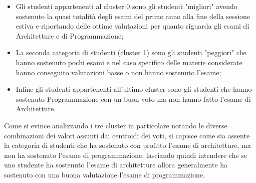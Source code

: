 \documentclass[12pt]{article}
\begin{document}
\begin{itemize}
	\item Gli studenti appartenenti al cluster 0 sono gli studenti "migliori" a\-vendo sostenuto la quasi totalità degli esami del primo anno alla fine della sessione estiva e riportando delle ottime valutazioni per quanto riguarda gli esami di Architetture e di Programmazione;
	\item La seconda categoria di studenti (cluster 1) sono gli studenti "peg\-giori" che hanno sostenuto pochi esami e nel caso specifico delle materie considerate hanno conseguito valutazioni basse o non hanno sostenuto l'esame;
	\item Infine gli studenti appartenenti all'ultimo cluster sono gli studenti che hanno sostenuto Programmazione con un buon voto ma non hanno fatto l'esame di Architetture.
\end{itemize}
Come si evince analizzando i tre cluster in particolare notando le diverse combinazioni dei valori assunti dai centroidi dei voti, si capisce come sia assente la categoria di studenti che ha sostenuto con profitto l'esame di architetture, ma non ha sostenuto l'esame di programmazione,
lasciando quindi intendere che se uno studente ha sostenuto l'esame di architetture allora generalmente ha sostenuto con una buona valutazione l'esame di programmazione.
\end{document}
